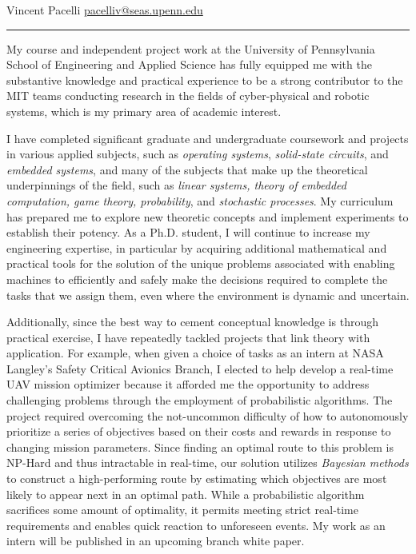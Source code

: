 \documentclass[11pt]{letter}
\title{}
\author{}
\begin{document}
\newcommand{\comm}[1]{}

Vincent Pacelli \hfill \hfill \href{mailto:pacelliv@seas.upenn.edu}{pacelliv@seas.upenn.edu}\\
\rule{\textwidth}{0.1pt}

My course and independent project work at the University of Pennsylvania School of Engineering and Applied Science has fully equipped me with the substantive knowledge and practical experience to be a strong contributor to the MIT teams conducting research in the fields of cyber-physical and robotic systems, which is my primary area of academic interest.

I have completed significant graduate and undergraduate coursework and projects in various applied subjects, such as \emph{operating systems}, \emph{solid-state circuits}, and \emph{embedded systems}, and many of the subjects that make up the theoretical underpinnings of the field, such as \emph{linear systems, theory of embedded computation, game theory, probability}, and \emph{stochastic processes}.  My curriculum has prepared me to explore new theoretic concepts and implement experiments to establish their potency.  As a Ph.D. student, I will continue to increase my engineering expertise, in particular by acquiring additional mathematical and practical tools for the solution of the unique problems associated with enabling machines to efficiently and safely make the decisions required to complete the tasks that we assign them, even where the environment is dynamic and uncertain.

Additionally, since the best way to cement conceptual knowledge is through practical exercise, I have repeatedly tackled projects that link theory with application. For example, when given a choice of tasks as an intern at NASA Langley’s Safety Critical Avionics Branch, I elected to help develop a real-time UAV mission optimizer because it afforded me the opportunity to address challenging problems through the employment of probabilistic algorithms. The project required overcoming the not-uncommon difficulty of how to autonomously prioritize a series of objectives based on their costs and rewards in response to changing mission parameters. Since finding an optimal route to this problem is NP-Hard and thus intractable in real-time, our solution utilizes \emph{Bayesian methods} to construct a high-performing route by estimating which objectives are most likely to appear next in an optimal path.  While a probabilistic algorithm sacrifices some amount of optimality, it permits meeting strict real‑time requirements and enables quick reaction to unforeseen events.  My work as an intern will be published in an upcoming branch white paper.
\end{document}
